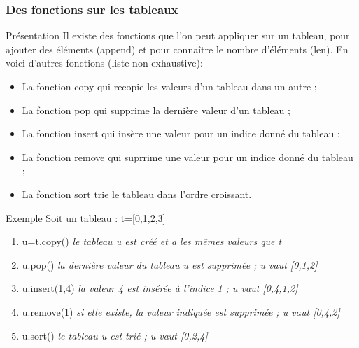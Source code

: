 \documentclass[9pt]{beamer}
\newcounter{num}
\begin{document}
\begin{frame}
\frametitle{Des fonctions sur les tableaux}

\begin{block}{Présentation}
Il existe des fonctions que l'on peut appliquer sur un tableau, pour ajouter des éléments (append) et pour connaître le nombre d'éléments (len). En voici d'autres fonctions (liste non exhaustive):
\begin{itemize}
\item La fonction copy qui recopie les valeurs d'un tableau dans un autre ;\\
\item La fonction pop qui supprime la dernière valeur d'un tableau ;
\item La fonction insert qui insère une valeur pour un indice donné du tableau ;
\item La fonction remove qui suprrime une valeur pour un indice donné du tableau ;
\item La fonction sort trie le tableau dans l'ordre croissant.
\end{itemize}
\end{block}

\begin{exampleblock}{Exemple}
Soit un tableau : t=[0,1,2,3]
\begin{enumerate}
\item u=t.copy() \hspace{1cm} \textit{le tableau u est créé et a les mêmes valeurs que t}
\item u.pop() \hspace{1cm} \textit{la dernière valeur du tableau u est supprimée ; u vaut [0,1,2]}
\item u.insert(1,4) \hspace{1cm} \textit{la valeur 4 est insérée à l'indice 1 ; u vaut [0,4,1,2]}
\item u.remove(1) \hspace{1cm} \textit{si elle existe, la valeur indiquée est supprimée ; u vaut [0,4,2]}
\item u.sort() \hspace{1cm} \textit{le tableau u est trié ; u vaut [0,2,4]}
\end{enumerate}
\end{exampleblock}

\end{frame}
\end{document}
